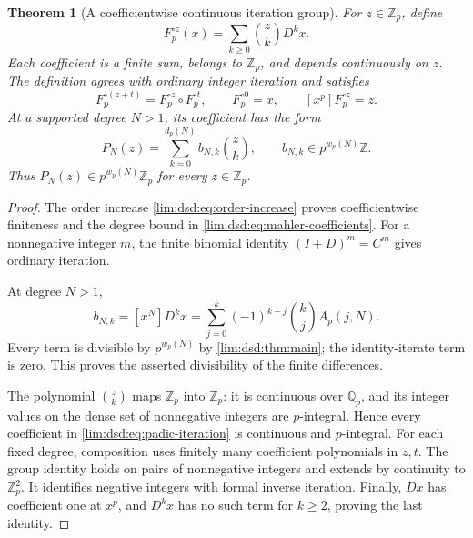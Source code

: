 \documentclass[11pt]{article}
\newtheorem{theorem}{Theorem}[section]
\theoremstyle{definition}
\theoremstyle{remark}
\newcommand{\Z}{\mathbb Z}
\newcommand{\Q}{\mathbb Q}
\begin{document}
\begin{theorem}[A coefficientwise continuous iteration group]
\label{lim:dsd:thm:padic}
For $z\in\Z_p$, define
\begin{equation}
 F_p^{\circ z}(x)=\sum_{k\ge0}\binom zkD^kx.
 \label{lim:dsd:eq:padic-iteration}
\end{equation}
Each coefficient is a finite sum, belongs to $\Z_p$, and depends
continuously on $z$. The definition agrees with ordinary integer
iteration and satisfies
\begin{equation}
 F_p^{\circ(z+t)}=F_p^{\circ z}\circ F_p^{\circ t},\qquad
 F_p^{\circ0}=x,
 \qquad [x^p]F_p^{\circ z}=z.
 \label{lim:dsd:eq:padic-group}
\end{equation}
At a supported degree $N>1$, its coefficient has the form
\begin{equation}
 P_N(z)=\sum_{k=0}^{d_p(N)}b_{N,k}\binom zk,
 \qquad b_{N,k}\in p^{w_p(N)}\Z.
 \label{lim:dsd:eq:mahler-coefficients}
\end{equation}
Thus $P_N(z)\in p^{w_p(N)}\Z_p$ for every $z\in\Z_p$.
\end{theorem}
\begin{proof}
The order increase \eqref{lim:dsd:eq:order-increase} proves coefficientwise
finiteness and the degree bound in \eqref{lim:dsd:eq:mahler-coefficients}.
For a nonnegative integer $m$, the finite binomial identity
$(I+D)^m=C^m$ gives ordinary iteration.

At degree $N>1$,
\begin{equation}
 b_{N,k}=[x^N]D^kx
 =\sum_{j=0}^k(-1)^{k-j}\binom kj A_p(j,N).
 \label{lim:dsd:eq:finite-difference}
\end{equation}
Every term is divisible by $p^{w_p(N)}$ by \cref{lim:dsd:thm:main};
the identity-iterate term is zero. This proves the asserted
divisibility of the finite differences.

The polynomial $\binom zk$ maps $\Z_p$ into $\Z_p$: it is
continuous over $\Q_p$, and its integer values on the dense set
of nonnegative integers are $p$-integral. Hence every coefficient
in \eqref{lim:dsd:eq:padic-iteration} is continuous and $p$-integral.
For each fixed degree, composition uses finitely many coefficient
polynomials in $z,t$. The group identity holds on pairs of
nonnegative integers and extends by continuity to $\Z_p^2$.
It identifies negative integers with formal inverse iteration.
Finally, $Dx$ has coefficient one at $x^p$, and $D^kx$ has no
such term for $k\ge2$, proving the last identity.
\end{proof}
\end{document}
